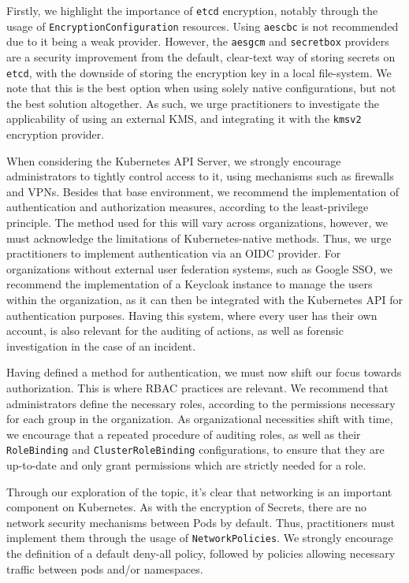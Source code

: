 \documentclass[a4paper,11pt,openright,BCOR=15mm]{scrbook}
\begin{document}
Firstly, we highlight the importance of \texttt{etcd} encryption, notably through the usage of \texttt{EncryptionConfiguration} resources. Using \texttt{aescbc} is not recommended due to it being a weak provider. However, the \texttt{aesgcm} and \texttt{secretbox} providers are a security improvement from the default, clear-text way of storing secrets on \texttt{etcd}, with the downside of storing the encryption key in a local file-system. We note that this is the best option when using solely native configurations, but not the best solution altogether. As such, we urge practitioners to investigate the applicability of using an external KMS, and integrating it with the \texttt{kmsv2} encryption provider.

When considering the Kubernetes API Server, we strongly encourage administrators to tightly control access to it, using mechanisms such as firewalls and VPNs. Besides that base environment, we recommend the implementation of authentication and authorization measures, according to the least-privilege principle. The method used for this will vary across organizations, however, we must acknowledge the limitations of Kubernetes-native methods. Thus, we urge practitioners to implement authentication via an OIDC provider. For organizations without external user federation systems, such as Google SSO, we recommend the implementation of a Keycloak instance to manage the users within the organization, as it can then be integrated with the Kubernetes API for authentication purposes. Having this system, where every user has their own account, is also relevant for the auditing of actions, as well as forensic investigation in the case of an incident.

Having defined a method for authentication, we must now shift our focus towards authorization. This is where RBAC practices are relevant. We recommend that administrators define the necessary roles, according to the permissions necessary for each group in the organization. As organizational necessities shift with time, we encourage that a repeated procedure of auditing roles, as well as their \texttt{RoleBinding} and \texttt{ClusterRoleBinding} configurations, to ensure that they are up-to-date and only grant permissions which are strictly needed for a role.

Through our exploration of the topic, it's clear that networking is an important component on Kubernetes. As with the encryption of Secrets, there are no network security mechanisms between Pods by default. Thus, practitioners must implement them through the usage of \texttt{NetworkPolicies}. We strongly encourage the definition of a default deny-all policy, followed by policies allowing necessary traffic between pods and/or namespaces.
\end{document}

